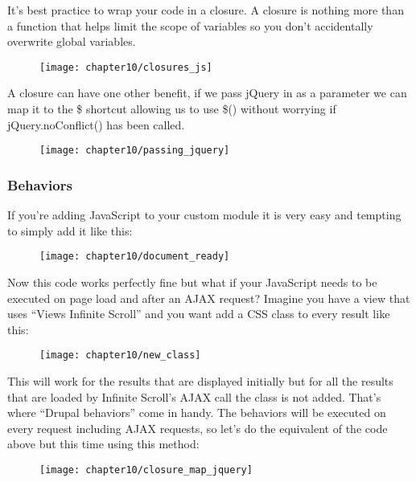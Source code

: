 It's best practice to wrap your code in a closure. A closure is nothing more than a function that helps limit the scope of variables so you don't accidentally overwrite global variables.

\begin{figure}[H]
	\centering
	\texttt{[image: chapter10/closures\_js]}
	\label{fig:closures_js}
\end{figure}

A closure can have one other benefit, if we pass jQuery in as a parameter we can map it to the \$ shortcut allowing us to use \$() without worrying if jQuery.noConflict() has been called.

\begin{figure}[H]
	\centering
	\texttt{[image: chapter10/passing\_jquery]}
	\label{fig:passing_jquery}
\end{figure}


\subsubsection{Behaviors}
If you’re adding JavaScript to your custom module it is very easy and tempting to simply add it like this:

\begin{figure}[H]
	\centering
	\texttt{[image: chapter10/document\_ready]}
	\label{fig:document_ready}
\end{figure}

Now this code works perfectly fine but what if your JavaScript needs to be executed on page load and after an AJAX request? Imagine you have a view that uses “Views Infinite Scroll” and you want add a CSS class to every result like this:

\begin{figure}[H]
	\centering
	\texttt{[image: chapter10/new\_class]}
	\label{fig:new_class}
\end{figure}

This will work for the results that are displayed initially but for all the results that are loaded by Infinite Scroll's AJAX call the class is not added. That’s where “Drupal behaviors” come in handy. The behaviors will be executed on every request including AJAX requests, so let's do the equivalent of the code above but this time using this method:

\begin{figure}[H]
	\centering
	\texttt{[image: chapter10/closure\_map\_jquery]}
	\label{fig:closure_map_jquery}
\end{figure}


